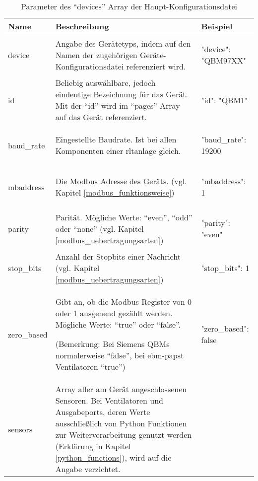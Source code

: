 \begin{enumerate}
	\begin{table}[H]
		\caption{Parameter des \enquote{devices} Array der Haupt-Konfigurationsdatei}
		\label{tab:devices_array_parameter}
		\begin{tabular}{p{} p{} | p{}}
			\toprule
			\textbf{Name} & \textbf{Beschreibung} & \textbf{Beispiel} \\
			\midrule
			device     	& Angabe des Gerätetyps, indem auf den Namen der zugehörigen Geräte-Konfigurationsdatei referenziert wird. & 	
			\begin{jsonTable}
"device": "QBM97XX"
			\end{jsonTable}  
			\\
			id         	& Beliebig auswählbare, jedoch eindeutige Bezeichnung für das Gerät. Mit der \enquote{id} wird im \enquote{pages} Array auf das Gerät referenziert.  & 	
			\begin{jsonTable}
"id": "QBM1"
			\end{jsonTable}  
			\\
			baud\_rate	& Eingestellte Baudrate. Ist bei allen Komponenten einer \acs{rltanlage} gleich. & 	
			\begin{jsonTable}
"baud_rate": 19200
			\end{jsonTable}  
			\\
			mbaddress	& Die Modbus Adresse des Geräts. (vgl. Kapitel \ref{modbus_funktionsweise}) & 	
			\begin{jsonTable}
"mbaddress": 1
			\end{jsonTable}  
			\\
			parity	& Parität. Mögliche Werte: \enquote{even}, \enquote{odd} oder \enquote{none} (vgl. Kapitel \ref{modbus_uebertragungsarten}) & 	
			\begin{jsonTable}
"parity": "even"
			\end{jsonTable}  
			\\
			stop\_bits	& Anzahl der Stopbits einer Nachricht (vgl. Kapitel \ref{modbus_uebertragungsarten}) & 	
			\begin{jsonTable}
"stop_bits": 1
			\end{jsonTable}  
			\\
			zero\_based	& Gibt an, ob die Modbus Register von 0 oder 1 ausgehend gezählt werden. Mögliche Werte: \enquote{true} oder \enquote{false}.
			
			(Bemerkung: Bei Siemens QBMs normalerweise \enquote{false}, bei ebm-papst Ventilatoren \enquote{true}) & 	
			\begin{jsonTable}
"zero_based": false
			\end{jsonTable}  
			\\
			sensors	& Array aller am Gerät angeschlossenen Sensoren. Bei Ventilatoren und Ausgabeports, deren Werte ausschließlich von Python Funktionen zur Weiterverarbeitung genutzt werden (Erklärung in Kapitel \ref{python_functions}), wird auf die Angabe verzichtet. 
			

\end{tabular}
\end{table}
\end{enumerate}
